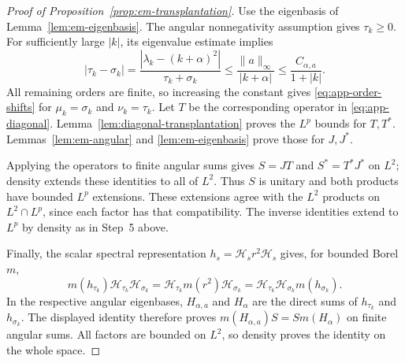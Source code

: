 \documentclass[11pt,a4paper,reqno,backref=page]{amsart}
\newcommand{\HH}{\mathcal H}                 %
\numberwithin{equation}{section}
\theoremstyle{definition}
\theoremstyle{remark}
\begin{document}
\begin{proof}[Proof of
  Proposition~\ref{prop:em-transplantation}]
  Use the eigenbasis of Lemma~\ref{lem:em-eigenbasis}.
  The angular nonnegativity assumption gives $\tau_k\ge0$.
  For sufficiently large $|k|$, its eigenvalue estimate
  implies
  \begin{equation*}
    |\tau_k-\sigma_k|
    =\frac{|\lambda_k-(k+\alpha)^2|}
      {\tau_k+\sigma_k}
    \le\frac{\|a\|_\infty}{|k+\alpha|}
    \le\frac{C_{\alpha,a}}{1+|k|}.
  \end{equation*}
  All remaining orders are finite, so increasing the
  constant gives \eqref{eq:app-order-shifts} for
  $\mu_k=\sigma_k$ and $\nu_k=\tau_k$. Let $T$ be the
  corresponding operator in \eqref{eq:app-diagonal}.
  Lemma~\ref{lem:diagonal-transplantation} proves the
  $L^p$ bounds for $T,T^*$. Lemmas~\ref{lem:em-angular}
  and \ref{lem:em-eigenbasis} prove those for $J,J^*$.

  Applying the operators to finite angular sums gives
  $S=JT$ and $S^*=T^*J^*$ on $L^2$; density extends these
  identities to all of $L^2$. Thus $S$ is unitary and both
  products have bounded $L^p$ extensions. These extensions
  agree with the $L^2$ products on $L^2\cap L^p$, since
  each factor has that compatibility. The inverse
  identities extend to $L^p$ by density as in Step~5 above.

  Finally, the scalar spectral representation
  $h_s=\HH_s r^2\HH_s$ gives, for bounded Borel $m$,
  \begin{equation*}
    m(h_{\tau_k})\HH_{\tau_k}\HH_{\sigma_k}
    =\HH_{\tau_k}m(r^2)\HH_{\sigma_k}
    =\HH_{\tau_k}\HH_{\sigma_k}m(h_{\sigma_k}).
  \end{equation*}
  In the respective angular eigenbases, $H_{\alpha,a}$
  and $H_\alpha$ are the direct sums of $h_{\tau_k}$
  and $h_{\sigma_k}$. The displayed identity therefore
  proves $m(H_{\alpha,a})S=Sm(H_\alpha)$ on finite angular
  sums. All factors are bounded on $L^2$, so density
  proves the identity on the whole space.
\end{proof}
\end{document}
